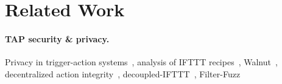 \section{Related Work}
\label{sec:related}

\paragraph{TAP security \& privacy.}
Privacy in trigger-action systems~\cite{DBLP:conf/sp/ChenCWSCF21}, analysis of
IFTTT
recipes~\cite{DBLP:conf/chi/UrHBLMPSL16,DBLP:conf/www/SurbatovichABDJ17,DBLP:conf/imc/MiQZW17},
Walnut~\cite{DBLP:journals/corr/abs-2009-12447}, decentralized action
integrity~\cite{DBLP:conf/ndss/FernandesRJP18},
decoupled-IFTTT~\cite{DBLP:journals/corr/FernandesRJP17},
Filter-Fuzz~\cite{DBLP:journals/access/XuZZCDG19}
